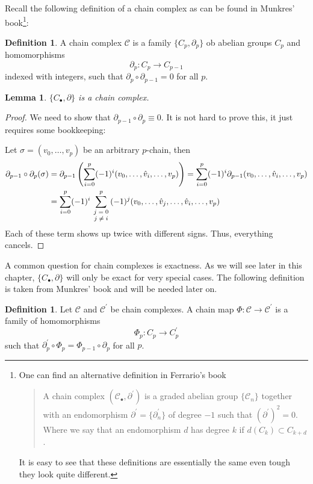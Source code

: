 \documentclass[toc=bib, headinclude]{scrartcl}
\theoremstyle{plain}
\newtheorem{lemma}[theorem]{Lemma}
\theoremstyle{definition}
\newtheorem	{definition}[theorem]{Definition}
\theoremstyle{remark}
\begin{document}
Recall the following definition of a chain complex as can be found in Munkres' book\footnote{One can find an alternative definition in Ferrario's book\parencite[p. 65]{fe}
	\begin{quotation}
		A chain complex $(\mathcal{C}_\bullet,\partial^\prime)$ is a graded abelian group $\{\mathcal{C}_n\}$ together with an endomorphism $\partial^\prime=\{\partial^\prime_n\}$ of degree  $-1$ such that $(\partial^\prime)^2=0$. Where we say that an endomorphism $d$ has degree $k$ if $d(C_k)\subset C_{k+d}$.
\end{quotation}
It is easy to see that these definitions are essentially the same even tough they look quite different.
}\parencite[p. 71]{mu}:
\begin{definition}
	A chain complex $\mathcal{C}$ is a family $\{C_p,\partial_p\}$ ob abelian groups $C_p$ and homomorphisms\[
	\partial_p: C_p\to C_{p-1}
	\]
	indexed with integers, such that $\partial_p\circ \partial_{p-1}=0$ for all $p$.
\end{definition}

 

\begin{lemma}
	$\{C_\bullet,\partial\}$ is a chain complex.
\end{lemma}

\begin{proof}
	We need to show that $\partial_{p-1}\circ\partial_p\equiv 0$. It is not hard to prove this, it just requires some bookkeeping:
	
	Let $\sigma=(v_0,\dots,v_p)$ be an arbitrary $p$-chain, then
	\begin{align*}
		\partial_{p-1}\circ\partial_p(\sigma)&=\partial_{p-1}\left(\sum_{i=0}^{p}(-1)^i(v_0,\dots,\hat{v}_i,\dots,v_p)\right)=\sum_{i=0}^{p}(-1)^i\partial_{p-1}(v_0,\dots,\hat{v}_i,\dots,v_p)\\
		&=\sum_{i=0}^{p}(-1)^i\sum_{\parbox{.8cm}{\centering\scriptsize
				$j=0$\\$j\neq i$}}^{p}(-1)^j(v_0,\dots,\hat{v}_j,\dots,\hat{v}_i,\dots,v_p)
	\end{align*}
	Each of these term shows up twice with different signs. Thus, everything cancels.

\end{proof}

A common question for chain complexes is exactness. As we will see later in this chapter, $\{C_\bullet,\partial\}$ will only be exact for very special cases. 
The following definition is taken from Munkres' book \parencite[p. 72]{mu} and will be needed later on.
\begin{definition}
	Let $\mathcal{C}$ and $\mathcal{C}^\prime$ be chain complexes. A chain map $\Phi:\mathcal{C}\to\mathcal{C}^\prime$ is a family of homomorphisms
	\[
	\Phi_p:C_p\to C_p^\prime
	\]
	such that $\partial_p^\prime\circ\Phi_p=\Phi_{p-1}\circ\partial_p$ for all $p$.
\end{definition}
\end{document}
